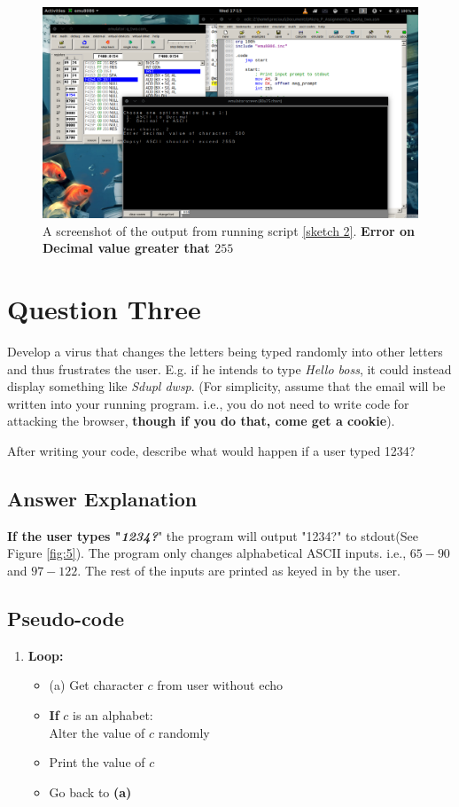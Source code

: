 \documentclass[]{article}
\begin{document}
\begin{figure}[h]
	\includegraphics[width=12cm]{q_two/q2_input_gthan_255.png}
	\centering
	\caption{A screenshot of the output from running script \ref{sketch 2}. \textbf{Error on Decimal value greater that $255$}}
\end{figure}

\clearpage
\section{Question Three}

Develop a virus that changes the letters being typed randomly into other letters and thus frustrates the user. E.g. if he intends to type \emph{Hello boss}, it could instead display something like \emph{Sdupl dwsp}. (For simplicity, assume that the email will be written into your running program. i.e., you do not need to write code for attacking the browser, \textbf{ though if you do that, come get a cookie}).

After writing your code, describe what would happen if a user typed
1234?

\subsection{Answer Explanation}
\textbf{If the user types "\emph{1234?}}" the program will output "1234?" to stdout(See Figure \ref{fig:5}). The program only changes alphabetical ASCII inputs. i.e., $65 - 90 $ and $97 - 122$. The rest of the inputs are printed as keyed in by the user.

\subsection{Pseudo-code}
\begin{enumerate}
	\item \textbf{Loop:}
	\begin{itemize}
		\item (a) Get character $c$ from user without echo
		\item \textbf{If} $c$ is an alphabet: \\
		\hspace*{6em} Alter the value of $c$ randomly
		\item Print the value of $c$
		\item Go back to \textbf{(a)}
		
	\end{itemize}
\end{enumerate}
\end{document}
